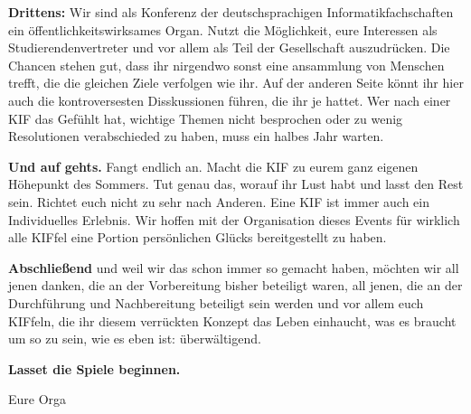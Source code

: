 \textbf{Drittens:}
Wir sind als Konferenz der deutschsprachigen Informatikfachschaften ein öffentlichkeitswirksames Organ.
Nutzt die Möglichkeit, eure Interessen als Studierendenvertreter und vor allem als Teil der Gesellschaft auszudrücken.
Die Chancen stehen gut, dass ihr nirgendwo sonst eine ansammlung von Menschen trefft, die die gleichen Ziele verfolgen wie ihr.
Auf der anderen Seite könnt ihr hier auch die kontroversesten Disskussionen führen, die ihr je hattet.
Wer nach einer KIF das Gefühlt hat, wichtige Themen nicht besprochen oder zu wenig Resolutionen verabschieded zu haben, muss ein halbes Jahr warten.

\textbf{Und auf gehts.}
Fangt endlich an.
Macht die KIF zu eurem ganz eigenen Höhepunkt des Sommers.
Tut genau das, worauf ihr Lust habt und lasst den Rest sein.
Richtet euch nicht zu sehr nach Anderen.
Eine KIF ist immer auch ein Individuelles Erlebnis.
Wir hoffen mit der Organisation dieses Events für wirklich alle KIFfel eine Portion persönlichen Glücks bereitgestellt zu haben.

\textbf{Abschließend} und weil wir das schon immer so gemacht haben, möchten wir all jenen danken, die an der Vorbereitung bisher beteiligt waren, all jenen, die an der Durchführung und Nachbereitung beteiligt sein werden und vor allem euch KIFfeln, die ihr diesem verrückten Konzept das Leben einhaucht, was es braucht um so zu sein, wie es eben ist: überwältigend.

\textbf{Lasset die Spiele beginnen.}

\vspace{5mm}
\noindent
Eure Orga
